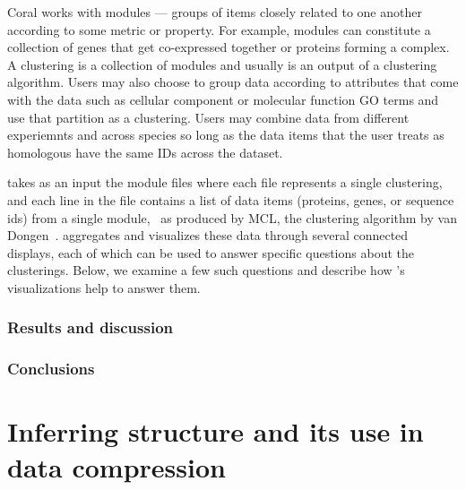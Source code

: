 \documentclass[12pt]{cmuthesis}
\begin{document}
  \vspace*{12pt}
  Coral works with modules --- groups of items closely related to one
  another according to some metric or property. For example, modules can
  constitute a collection of genes that get co-expressed together or proteins
  forming a complex. A clustering is a collection of modules and usually is an
  output of a clustering algorithm. Users may also choose to group data according
  to attributes that come with the data such as cellular component or molecular
  function GO terms and use that partition as a clustering. Users may combine data
  from different experiemnts and across species so long as the data items that the
  user treats as homologous have the same IDs across the dataset.

  \Coral takes as an input the module files where each file represents a single
  clustering, and each line in the file contains a list of data items (proteins,
  genes, or sequence ids) from a single module, \eg~as produced by MCL,
  the clustering algorithm by van Dongen~\cite{VanDongen2000}. \Coral aggregates
  and visualizes these data through several connected displays, each of which can
  be used to answer specific questions about the clusterings. Below, we examine a
  few such questions and describe how \Coral's visualizations help to answer them.

  

\section{Results and discussion}

\section{Conclusions}


\part{Inferring structure and its use in data compression}

\end{document}
